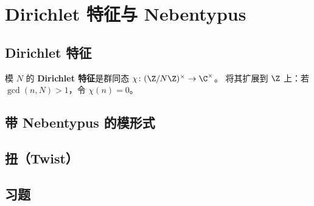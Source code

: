 \chapter{Dirichlet 特征与 Nebentypus}
\label{ch:dirichlet-characters}

\section{Dirichlet 特征}

\begin{definition}[Dirichlet 特征]
模 $N$ 的 \textbf{Dirichlet 特征}是群同态
$\chi\colon (\Z/N\Z)^\times \to \C^\times$。
将其扩展到 $\Z$ 上：若 $\gcd(n, N) > 1$，令 $\chi(n) = 0$。
\end{definition}


\section{带 Nebentypus 的模形式}


\section{扭（Twist）}


\section{习题}
